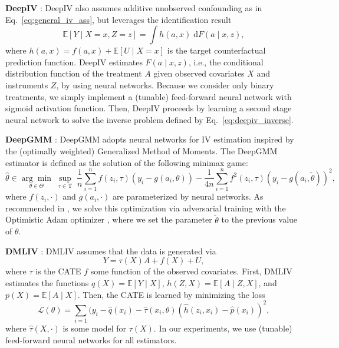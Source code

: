 \documentclass{article} %
\newcommand{\E}{\mathbb{E}}
\theoremstyle{definition}
\theoremstyle{plain}
\begin{document}
\textbf{DeepIV} \citep{Hartford.2017}: DeepIV \citep{Hartford.2017} also assumes additive unobserved confounding as in Eq.~\eqref{eq:general_iv_ass}, but leverages the identification result \citep{Newey.2003}
\begin{equation}\label{eq:deepiv_inverse}
    \E[Y \mid X=x, Z=z] = \int h(a,x) \; \mathrm{d}F(a \mid  x, z),
\end{equation}
where $h(a,x) = f(a, x) + \E[U \mid X=x]$ is the target counterfactual prediction function. DeepIV estimates $F(a \mid x, z)$, i.e., the conditional distribution function of the treatment $A$ given observed covariates $X$ and instruments $Z$, by using neural networks. Because we consider only binary treatments, we simply implement a (tunable) feed-forward neural network with sigmoid activation function. Then, DeepIV proceeds by learning a second stage neural network to solve the inverse problem defined by Eq.~\eqref{eq:deepiv_inverse}.


\textbf{DeepGMM} \citep{Bennett.2019}: DeepGMM \citep{Bennett.2019} adopts neural networks for IV estimation inspired by the (optimally weighted) Generalized Method of Moments.
The DeepGMM estimator is defined as the solution of the following minimax game:
\begin{equation}
    \hat{\theta} \in \underset{\theta \in \Theta}{\arg \min} \; \underset{\tau \in \mathrm{T}}{\sup} \; \frac{1}{n} \sum_{i=1}^n f(z_i, \tau) (y_i - g(a_i, \theta)) - \frac{1}{4n} \sum_{i=1}^n f^2(z_i, \tau) (y_i - g(a_i, \widetilde{\theta}))^2,
\end{equation}
where $f(z_i, \cdot)$ and $g(a_i, \cdot)$ are parameterized by neural networks. As recommended in \citep{Bennett.2019}, we solve this optimization via adversarial training with the Optimistic Adam optimizer \citep{Daskalakis.2018}, where we set the parameter $\widetilde{\theta}$ to the previous value of $\theta$.

\textbf{DMLIV} \citep{Syrgkanis.2019}: DMLIV \citep{Syrgkanis.2019} assumes that the data is generated via
\begin{equation}
    Y = \tau(X) A + f(X) + U,
\end{equation}
where $\tau$ is the CATE $f$ some function of the observed covariates. First, DMLIV estimates the functions $q(X) = \E[Y \mid X]$, $h(Z, X) = \E[A \mid Z, X]$, and $p(X) = \E[A \mid X]$. Then, the CATE is learned by minimizing the loss 
\begin{equation}
    \mathcal{L}(\theta) = \sum_{i=1}  (y_i - \hat{q}(x_i) - \hat{\tau}(x_i, \theta) (\hat{h}(z_i, x_i) - \hat{p}(x_i))^2,
\end{equation}
where $\hat{\tau}(X, \cdot)$ is some model for $\tau(X)$. In our experiments, we use (tunable) feed-forward neural networks for all estimators.
\end{document}
